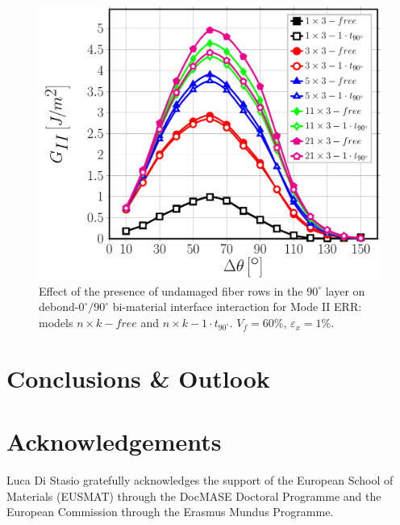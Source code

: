 \documentclass[review]{elsarticle}
\begin{document}
\begin{figure}[!h]
\centering
\includegraphics[width=\textwidth]{nxk-1-vf60-GII.pdf}
\caption{Effect of the presence of undamaged fiber rows in the $90^{\circ}$ layer on debond-$0^{\circ}/90^{\circ}$ bi-material interface interaction for Mode II ERR: models $n\times k-free$ and $n\times k-1\cdot t_{90^{\circ}}$. $V_{f}=60\%$, $\varepsilon_{x}=1\%$.}\label{fig:debonddebondGII}
\end{figure}


\section{Conclusions \& Outlook}


\section*{Acknowledgements}

Luca Di Stasio gratefully acknowledges the support of the European School of Materials (EUSMAT) through the DocMASE Doctoral Programme and the European Commission through the Erasmus Mundus Programme.



\end{document}
